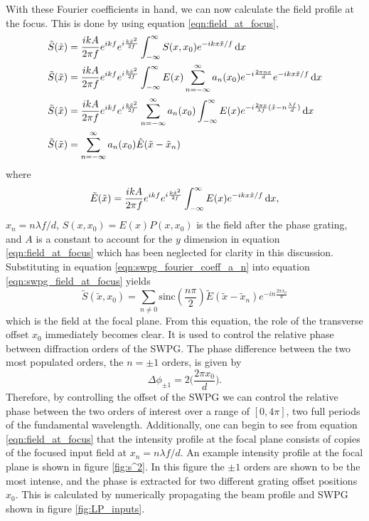 With these Fourier coefficients in hand, we can now calculate the field profile at the focus.  This is done by using equation \ref{eqn:field_at_focus},
\begin{equation}
\label{eqn:swpg_field_at_focus}
	\begin{aligned}
		\tilde{S}(\tilde{x}) &= \frac{i k A}{2\pi f}e^{ikf}e^{i\frac{k\tilde{x}^2}{2f}}\int_{-\infty}^{\infty}S(x,x_0)e^{-ikx\tilde{x}/f}\mathop{}\!\mathrm{d} x\\
		\tilde{S}(\tilde{x}) &= \frac{i k A}{2\pi f}e^{ikf}e^{i\frac{k\tilde{x}^2}{2f}}\int_{-\infty}^{\infty} E(x) \sum_{n=-\infty}^{\infty}a_n(x_0)e^{-i\frac{2\pi nx}{d}} e^{-ikx\tilde{x}/f}\mathop{}\!\mathrm{d} x\\
		\tilde{S}(\tilde{x}) &= \frac{i k A}{2\pi f}e^{ikf}e^{i\frac{k\tilde{x}^2}{2f}}\sum_{n=-\infty}^{\infty}a_n(x_0) \int_{-\infty}^{\infty} E(x) e^{-i\frac{2\pi x}{\lambda f}(\tilde{x} - n\frac{\lambda f}{d})}\mathop{}\!\mathrm{d} x\\
		\tilde{S}(\tilde{x}) &= \sum_{n=-\infty}^{\infty} a_n(x_0) \tilde{E}(\tilde{x} - \tilde{x}_n)
	\end{aligned}
\end{equation}
where
\begin{equation}
	\tilde{E}(\tilde{x}) = \frac{i k A}{2\pi f}e^{ikf}e^{i\frac{k\tilde{x}^2}{2f}} \int_{-\infty}^{\infty}E(x)e^{-ikx\tilde{x}/f}\mathop{}\!\mathrm{d} x,
\end{equation}
$x_n=n\lambda f/d$, $S(x,x_0)=E(x)P(x,x_0)$ is the field after the phase grating, and $A$ is a constant to account for the $y$ dimension in equation \ref{eqn:field_at_focus} which has been neglected for clarity in this discussion.  Substituting in equation \ref{eqn:swpg_fourier_coeff_a_n} into equation \ref{eqn:swpg_field_at_focus} yields
\begin{equation}
\label{eqn:swpg_field_at_focus_simple}
	\tilde{S}(\tilde{x}, x_0)=\sum_{n\neq 0}\mathrm{sinc}(\frac{n\pi}{2})\tilde{E}(\tilde{x}-\tilde{x}_n)e^{-in\frac{2\pi x_0}{d}}
\end{equation}
which is the field at the focal plane. From this equation, the role of the transverse offset $x_0$ immediately becomes clear.  It is used to control the relative phase between diffraction orders of the SWPG.  The phase difference between the two most populated orders, the $n=\pm 1$ orders, is given by
\begin{equation}
\label{eqn:phase_diff}
	\Delta\phi_{\pm 1}=2\bigg(\frac{2\pi x_0}{d}\bigg).
\end{equation}
Therefore, by controlling the offset of the SWPG we can control the relative phase between the two orders of interest over a range of $[0,4\pi]$, two full periods of the fundamental wavelength.  Additionally, one can begin to see from equation \ref{eqn:field_at_focus} that the intensity profile at the focal plane consists of copies of the focused input field at $x_n = n\lambda f/d$.  An example intensity profile at the focal plane is shown in figure \ref{fig:s^2}. In this figure the $\pm1$ orders are shown to be the most intense, and the phase is extracted for two different grating offset positions $x_0$.  This is calculated by numerically propagating the beam profile and SWPG shown in figure \ref{fig:LP_inputs}.
